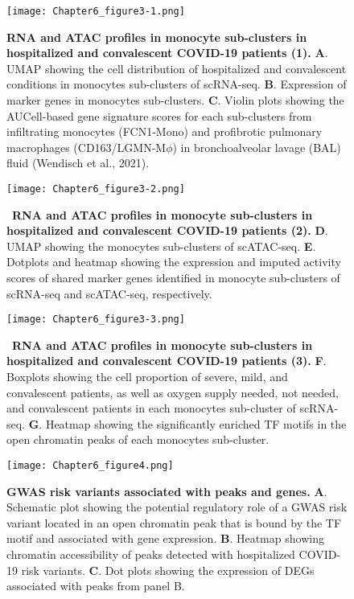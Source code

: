 \documentclass{book}
\begin{document}
\begin{refsection}
\begin{figure}%
  \centering
  \texttt{[image: Chapter6\_figure3-1.png]}
  \caption{\label{fig:chp6fig3}
    \textbf{RNA and ATAC profiles in monocyte sub-clusters in hospitalized and convalescent COVID-19 patients (1).}
    \textbf{A}. UMAP showing the cell distribution of hospitalized and convalescent conditions in monocytes sub-clusters of scRNA-seq.
    \textbf{B}. Expression of marker genes in monocytes sub-clusters.
    \textbf{C}. Violin plots showing the AUCell-based gene signature scores for each sub-clusters from infiltrating monocytes (FCN1-Mono) and profibrotic pulmonary macrophages (CD163/LGMN-M$\phi$) in bronchoalveolar lavage (BAL) fluid (Wendisch et al., 2021).
  }
\end{figure}
\begin{figure}%
  \centering
  \addtocounter{figure}{-1}
  \texttt{[image: Chapter6\_figure3-2.png]}
  \caption{
    ~\textbf{RNA and ATAC profiles in monocyte sub-clusters in hospitalized and convalescent COVID-19 patients (2).}
    \textbf{D}. UMAP showing the monocytes sub-clusters of scATAC-seq.
    \textbf{E}. Dotplots and heatmap showing the expression and imputed activity scores of shared marker genes identified in monocyte sub-clusters of scRNA-seq and scATAC-seq, respectively.
  }
\end{figure}
\begin{figure}%
  \centering
  \addtocounter{figure}{-1}
  \texttt{[image: Chapter6\_figure3-3.png]}
  \caption{
    ~\textbf{RNA and ATAC profiles in monocyte sub-clusters in hospitalized and convalescent COVID-19 patients (3).}
    \textbf{F}. Boxplots showing the cell proportion of severe, mild, and convalescent patients, as well as oxygen supply needed, not needed, and convalescent patients in each monocytes sub-cluster of scRNA-seq.
    \textbf{G}. Heatmap showing the significantly enriched TF motifs in the open chromatin peaks of each monocytes sub-cluster.
  }
\end{figure}

\begin{landscape}
\begin{figure}%
  \centering
  \texttt{[image: Chapter6\_figure4.png]}
  \caption{\label{fig:chp6fig4}
    \textbf{GWAS risk variants associated with peaks and genes.}
    \textbf{A}. Schematic plot showing the potential regulatory role of a GWAS risk variant located in an open chromatin peak that is bound by the TF motif and associated with gene expression.
    \textbf{B}. Heatmap showing chromatin accessibility of peaks detected with hospitalized COVID-19 risk variants.
    \textbf{C}. Dot plots showing the expression of DEGs associated with peaks from panel B.
  }
\end{figure}
\end{landscape}


\end{refsection}
\end{document}
